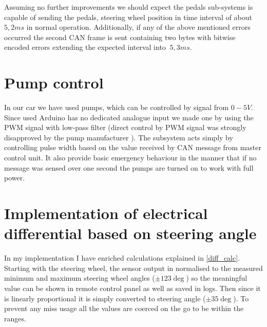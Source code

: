 Assuming no further improvements we should expect the pedals sub-systems is capable of sending the pedals, steering wheel position in time interval of about $5,2ms$ in normal operation.
Additionally, if any of the above mentioned errors occurred the second CAN frame is sent containing two bytes with bitwise encoded errors extending the expected interval into $~5,3ms$.

\section{Pump control}
In our car we have used  pumps, which can be controlled by signal from $0-5V$. Since used Arduino has no dedicated analogue input we made one by using the PWM signal with low-pass filter (direct control by PWM signal was strongly disapproved by the pump manufacturer ).
The subsystem acts simply by controlling pulse width based on the value received by CAN message from master control unit. It also provide basic emergency behaviour in the manner that if no message was sensed over one second the pumps are turned on to work with full power.






\section{Implementation of electrical differential based on steering angle}\label{diff_meth}
In my implementation I have enriched calculations explained in \ref{diff_calc}. Starting with the steering wheel, the sensor output in normalised to the measured minimum and maximum steering wheel angles ($\pm123\deg$) so the meaningful value can be shown in remote control panel as well as saved in logs. 
Then since it is linearly proportional it is simply converted to steering angle ($\pm35\deg$). To prevent any miss usage all the values are coerced on the go to be within the ranges.

